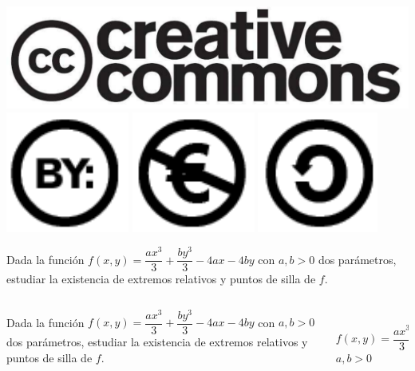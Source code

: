 \documentclass[aspectratio=149,10pt,xcolor=dvipsnames,t]{beamer}
\begin{document}
\begin{frame}[c]
\begin{center}
\biskip
\includegraphics[scale=0.07]{img/cc-logo}
\includegraphics[scale=0.2]{img/cc-by}
\includegraphics[scale=0.2]{img/cc-e}
\includegraphics[scale=0.2]{img/cc-c}
\end{center}
\end{frame}

\begin{frame}[c]
\Large
Dada la función $f(x, y) = \dfrac{ax^3}{3} + \dfrac{by^3}{3}-4ax-4by$ con $a,b>0$ dos parámetros, estudiar la
existencia de extremos relativos y puntos de silla de $f$.
\end{frame}


\begin{frame}
\begin{columns}
\begin{column}[T]{0.6\textwidth}
Dada la función $f(x, y) = \dfrac{ax^3}{3} + \dfrac{by^3}{3}-4ax-4by$ con $a,b>0$ dos parámetros, estudiar la
existencia de extremos relativos y puntos de silla de $f$.
\end{column}
\begin{column}[T]{0.4\textwidth}
\\
$f(x, y) = \dfrac{ax^3}{3} + \dfrac{by^3}{3}-2ax-2by$\\
$a,b>0$
\end{column}
\end{columns}
\end{frame}
\end{document}
